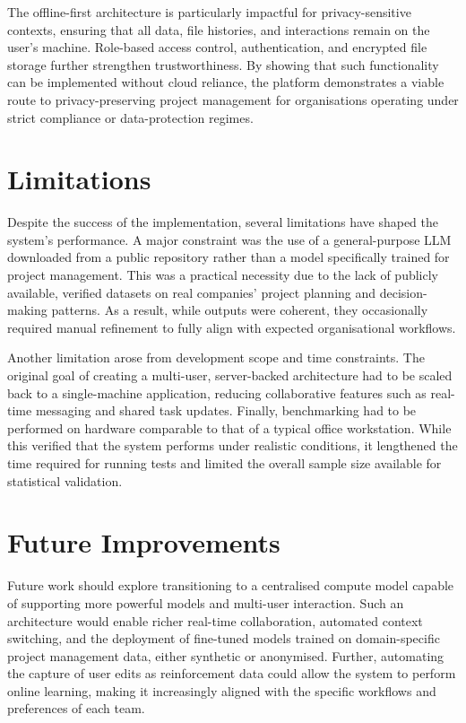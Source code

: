 \documentclass{report}
\begin{document}
The offline-first architecture is particularly impactful for privacy-sensitive contexts, ensuring that all data, file histories, and interactions remain on the user's machine. 
Role-based access control, authentication, and encrypted file storage further strengthen trustworthiness. 
By showing that such functionality can be implemented without cloud reliance, the platform demonstrates a viable route to privacy-preserving project management for organisations operating under strict compliance or data-protection regimes.

\section{Limitations}
Despite the success of the implementation, several limitations have shaped the system’s performance. 
A major constraint was the use of a general-purpose LLM downloaded from a public repository rather than a model specifically trained for project management. 
This was a practical necessity due to the lack of publicly available, verified datasets on real companies’ project planning and decision-making patterns. 
As a result, while outputs were coherent, they occasionally required manual refinement to fully align with expected organisational workflows.

Another limitation arose from development scope and time constraints. 
The original goal of creating a multi-user, server-backed architecture had to be scaled back to a single-machine application, reducing collaborative features such as real-time messaging and shared task updates. 
Finally, benchmarking had to be performed on hardware comparable to that of a typical office workstation. 
While this verified that the system performs under realistic conditions, it lengthened the time required for running tests and limited the overall sample size available for statistical validation.

\section{Future Improvements}
Future work should explore transitioning to a centralised compute model capable of supporting more powerful models and multi-user interaction. 
Such an architecture would enable richer real-time collaboration, automated context switching, and the deployment of fine-tuned models trained on domain-specific project management data, either synthetic or anonymised.
Further, automating the capture of user edits as reinforcement data could allow the system to perform online learning, making it increasingly aligned with the specific workflows and preferences of each team.
\end{document}
